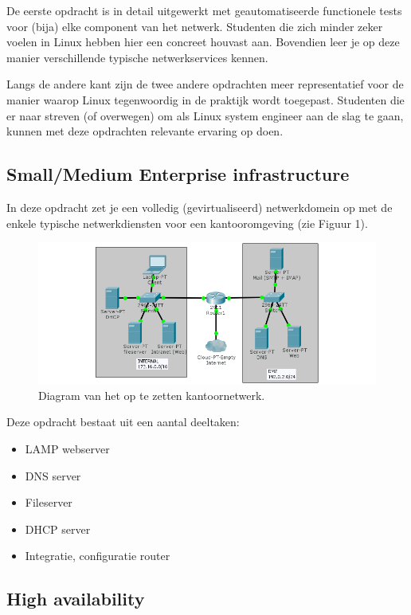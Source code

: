 De eerste opdracht is in detail uitgewerkt met geautomatiseerde functionele tests voor (bija) elke component van het netwerk. Studenten die zich minder zeker voelen in Linux hebben hier een concreet houvast aan. Bovendien leer je op deze manier verschillende typische netwerkservices kennen.

Langs de andere kant zijn de twee andere opdrachten meer representatief voor de manier waarop Linux tegenwoordig in de praktijk wordt toegepast. Studenten die er naar streven (of overwegen) om als Linux system engineer aan de slag te gaan, kunnen met deze opdrachten relevante ervaring op doen.

\subsection{Small/Medium Enterprise infrastructure}
\label{subs:smallmedium-enterprise-infrastructure}

In deze opdracht zet je een volledig (gevirtualiseerd) netwerkdomein op met de enkele typische netwerkdiensten voor een kantooromgeving (zie Figuur 1).

\begin{figure}[htbp]
\centering
\includegraphics[width=\textwidth]{img/assignment-sme.png}
\caption{Diagram van het op te zetten kantoornetwerk.}
\end{figure}

Deze opdracht bestaat uit een aantal deeltaken:

\begin{itemize}
\item LAMP webserver
\item DNS server
\item Fileserver
\item DHCP server
\item Integratie, configuratie router
\end{itemize}

\subsection{High availability}
\label{subs:high-availability}

